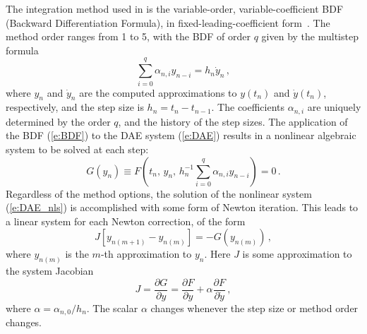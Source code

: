 The integration method used in {\idas} is the variable-order, variable-coefficient
BDF (Backward Differentiation Formula), in fixed-leading-coefficient
form~\cite{BCP:96}.
The method order ranges from 1 to 5, with the BDF of order $q$
given by the multistep formula
\begin{equation}\label{e:BDF}
  \sum_{i=0}^q \alpha_{n,i}y_{n-i} = h_n \dot y_n \, ,
\end{equation}
where $y_n$ and $\dot y_n$ are the computed approximations to $y(t_n)$
and $\dot y(t_n)$, respectively, and the step size is $h_n = t_n - t_{n-1}$.  
The coefficients $\alpha_{n,i}$ are uniquely determined by the order
$q$, and the history of the step sizes.  The application of the BDF
(\ref{e:BDF}) to the DAE system (\ref{e:DAE}) results in a nonlinear
algebraic system to be solved at each step:
\begin{equation}\label{e:DAE_nls}
  G(y_n) \equiv 
  F \left( t_n , \, y_n , \, 
    h_n^{-1} \sum_{i=0}^q \alpha_{n,i}y_{n-i} \right) = 0 \, .
\end{equation}
%
Regardless of the method options, the solution of the nonlinear system
(\ref{e:DAE_nls}) is accomplished with some form of Newton iteration.
This leads to a linear system for each Newton correction, of the form
\begin{equation}\label{e:DAE_Newtoncorr}
  J [y_{n(m+1)} - y_{n(m)}] = -G(y_{n(m)})  \, , 
\end{equation}
where $y_{n(m)}$ is the $m$-th approximation to $y_n$. 
%
Here $J$ is some approximation to the system Jacobian
\begin{equation}\label{e:DAE_Jacobian}
  J = \frac{\partial G}{\partial y}
  = \frac{\partial F}{\partial y} + 
  \alpha\frac{\partial F}{\partial \dot y} \, ,
\end{equation}
where $\alpha = \alpha_{n,0}/h_n$.  The scalar $\alpha$ changes 
whenever the step size or method order changes.

